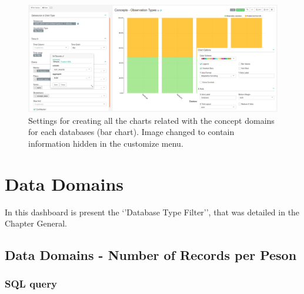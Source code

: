 \documentclass[
]{book}
\begin{document}
\begin{figure}
\includegraphics[width=1\linewidth]{images/conceptsDomainTypes} \caption{Settings for creating all the charts related with the concept domains for each databases (bar chart). Image changed to contain information hidden in the customize menu.}\label{fig:conceptsDomainTypes}
\end{figure}

\hypertarget{data-domains}{%
\chapter{Data Domains}\label{data-domains}}

In this dashboard is present the `'Database Type Filter'', that was detailed in the Chapter General.

\hypertarget{data-domains---number-of-records-per-peson}{%
\section{Data Domains - Number of Records per Peson}\label{data-domains---number-of-records-per-peson}}

\hypertarget{sql-query-24}{%
\subsection{SQL query}\label{sql-query-24}}
\end{document}
